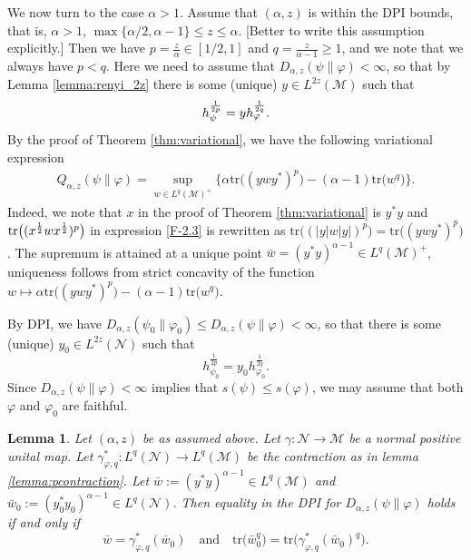 \documentclass[12pt]{article}
\newtheorem{lemma}[theorem]{Lemma}
\theoremstyle{definition}
\theoremstyle{remark}
\numberwithin{equation}{section}
\def\Me{\mathcal M}
\def\Ne{\mathcal N}
\def\Tr{\mathrm{tr}}
\def\ffi{\varphi}
\begin{document}
We now turn to the case $\alpha>1$. Assume that $(\alpha,z)$ is within the DPI bounds,
that is, $\alpha>1$, $\max\{\alpha/2,\alpha-1\}\le z\le\alpha$. [Better to write this assumption explicitly.] Then
we have $p=\frac z\alpha\in [1/2,1]$ and $q=\frac z{\alpha-1}\ge 1$, and we note that we always have $p<q$.
Here we need to assume that $D_{\alpha,z}(\psi\|\ffi)<\infty$, so that by Lemma \ref{lemma:renyi_2z}
there is some (unique) $y\in L^{2z}(\Me)$ such that
\[
h_{\psi}^{1\over 2p}=y h_\ffi^{1\over 2q}.
\]
By the proof of Theorem \ref{thm:variational}, we have the following variational expression
\begin{align}\label{eq:variationalq}
Q_{\alpha,z}(\psi\|\varphi) =\sup_{w\in
L^q(\Me)^+}\bigl\{\alpha\Tr\bigl((ywy^*)^p\bigr)-(\alpha-1)\Tr\bigl(w^q\bigr)\bigr\}.
\end{align}
Indeed, we note that $x$ in the proof of Theorem \ref{thm:variational} is $y^*y$ and
$\Tr\bigl((x^{1\over2}wx^{1\over2})^p\bigr)$ in expression \eqref{F-2.3} is rewritten as
$\Tr\bigl((|y|w|y|)^p\bigr)=\Tr\bigl((ywy^*)^p\bigr)$.
The supremum is attained at a unique point $\bar
w=(y^*y)^{\alpha-1}\in L^q(\Me)^+$, uniqueness follows from strict concavity of the
function $w\mapsto \alpha\Tr\bigl((ywy^*)^p\bigr)-(\alpha-1)\Tr\bigl( w^q\bigr)$.


By DPI, we have $D_{\alpha,z}(\psi_0\|\varphi_0)\le D_{\alpha,z}(\psi\|\varphi)<\infty$,
so that there is some (unique) $y_0\in L^{2z}(\Ne)$ such that 
\[
h_{\psi_0}^{\frac1{2p}}=y_0h_{\varphi_0}^{\frac1{2q}}.
\]
Since $D_{\alpha,z}(\psi\|\ffi)<\infty$ implies that $s(\psi)\le s(\ffi)$, we may assume that both $\ffi$ and
$\ffi_0$ are faithful.


\begin{lemma}\label{lemma:le}
Let $(\alpha,z)$ be as assumed above. Let $\gamma:\Ne\to\Me$ be a normal positive unital map. 
Let $\gamma^*_{\ffi,q}:L^q(\Ne)\to L^q(\Me)$ be the contraction as in lemma \ref{lemma:pcontraction}. 
Let $\bar w:=(y^*y)^{\alpha-1}\in L^q(\Me)$ and $\bar w_0:=(y_0^*y_0)^{\alpha-1}\in
L^q(\Ne)$. Then equality in the DPI for $D_{\alpha,z}(\psi\|\ffi)$ holds if and only if
\begin{equation}\label{eq:dpiw}
\bar w=\gamma^*_{\ffi,q}(\bar w_0)\quad \text{and}\quad  
\Tr\bigl(\bar w_0^q\bigr)=\Tr\bigl(\gamma^*_{\varphi,q}(\bar w_0)^q\bigr).
\end{equation}
\end{lemma}
\end{document}
